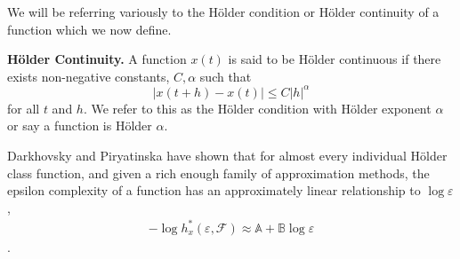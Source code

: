   We will be referring variously to the H\"older condition or 
  H\"older continuity of a function which we now define.
  \begin{defn}{\textbf{H\"older Continuity.} }\label{def:holder}
    A function $x(t)$ is said to be H\"older continuous if
  there exists non-negative constants, $C, \alpha$ such that 
  \[
      |x(t+h) - x(t)| \leq C|h|^{\alpha}
  \]
    for all $t$ and $h$.
  We refer to this as the H\"older condition with H\"older 
  exponent $\alpha$ or say a function is H\"older $\alpha$.
  \end{defn}
   Darkhovsky and Piryatinska have shown that for almost every
  individual H\"older class function, and given a rich 
  enough family of approximation methods,  
  the epsilon complexity of a function has an approximately linear
  relationship to $\log \varepsilon$,
  \begin{align} \label{eq:linear-ecomplex}
      -\log h_x^*(\varepsilon, \mathcal{F}) \approx \mathbb{A} + 
    \mathbb{B}\log \varepsilon  
  \end{align}\cite{darkhovsky2013}.
  
